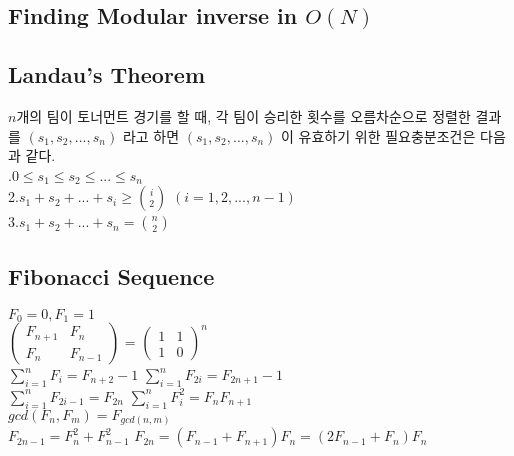 \documentclass[10pt,landscape,a4paper,twocolumn]{article}
\begin{document}
\subsection{Finding Modular inverse in $O(N)$}


\subsection{Landau's Theorem}
$n$개의 팀이 토너먼트 경기를 할 때, 각 팀이 승리한 횟수를 오름차순으로 정렬한 결과를 $(s_1,s_2, ... , s_n)$ 라고 하면 $(s_1,s_2, ... , s_n)$ 이 유효하기 위한 필요충분조건은 다음과 같다.\\
.\hspace{1em}$0 \le s_1 \le s_2 \le ... \le s_n$\\
2.\hspace{1em}$s_1+s_2+ ...+s_i \ge {i \choose 2}$ \hspace{1em}$(i=1,2,...,n-1)$\\
3.\hspace{1em}$s_1+s_2+ ...+s_n = {n \choose 2}$\\

\subsection{Fibonacci Sequence}
$F_0=0, F_1=1$\\

$
\begin{pmatrix}
    F_{n+1} & F_n \\
    F_n & F_{n-1}
\end{pmatrix}
$
=
$
\begin{pmatrix}
    1 & 1 \\
    1 & 0
\end{pmatrix}^n
$\\


$\sum_{i=1}^n F_i=F_{n+2}-1$
\hspace{10em}
$\sum_{i=1}^n F_{2i}=F_{2n+1}-1$\\

$\sum_{i=1}^n F_{2i-1}=F_{2n}$
\hspace{11em}
$\sum_{i=1}^n F_i^2=F_nF_{n+1}$\\

$gcd(F_n,F_m)=F_{gcd(n,m)}$\\

$F_{2n-1}=F_n^2+F_{n-1}^2$
\hspace{10em}
$F_{2n}=(F_{n-1}+F_{n+1})F_n=(2F_{n-1}+F_n)F_n$\\
\end{document}
